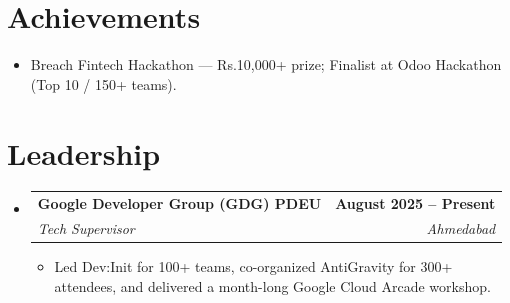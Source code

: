 \documentclass[letterpaper,10pt]{article}
\makeatletter
\newcommand{\resumeItem}[1]{\item #1\vspace{-2pt}}
\newcommand{\resumeSubheading}[4]{
  \vspace{-2pt}\item
  \begin{tabular*}{1.0\textwidth}[t]{l@{\extracolsep{\fill}}r}
    \textbf{#1} & \textbf{\small #2} \\
    \textit{\small #3} & \textit{\small #4}
  \end{tabular*}\vspace{-6pt}
}
\newcommand{\resumeSubHeadingListStart}{\begin{itemize}[leftmargin=0in, label={}]}
\newcommand{\resumeSubHeadingListEnd}{\end{itemize}\vspace{-7pt}}
\newcommand{\resumeItemListStart}{\begin{itemize}[leftmargin=0.2in, label=\textbullet]}
\newcommand{\resumeItemListEnd}{\end{itemize}\vspace{-5pt}}
\makeatother
\begin{document}
\section{Achievements}
\resumeItemListStart
  \resumeItem{Breach Fintech Hackathon — Rs.10,000+ prize; Finalist at Odoo Hackathon (Top 10 / 150+ teams).}
\resumeItemListEnd

\section{Leadership}
\resumeSubHeadingListStart
  \resumeSubheading
    {Google Developer Group (GDG) PDEU}{August 2025 -- Present}
    {Tech Supervisor}{Ahmedabad}
  \resumeItemListStart
    \resumeItem{Led Dev:Init for 100+ teams, co-organized AntiGravity for 300+ attendees, and delivered a month-long Google Cloud Arcade workshop.}
  \resumeItemListEnd
\resumeSubHeadingListEnd
\end{document}
